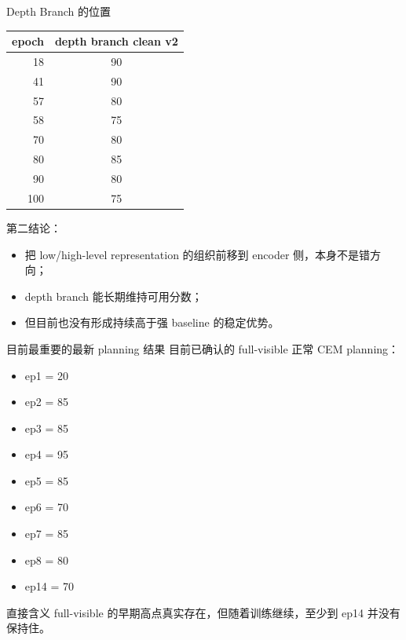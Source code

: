 \documentclass[aspectratio=169,11pt]{beamer}
\begin{document}
\begin{frame}{Depth Branch 的位置}
  \small
  \begin{tabular}{rc}
    \toprule
    epoch & depth branch clean v2 \\
    \midrule
    18 & 90 \\
    41 & 90 \\
    57 & 80 \\
    58 & 75 \\
    70 & 80 \\
    80 & 85 \\
    90 & 80 \\
    100 & 75 \\
    \bottomrule
  \end{tabular}

  \vspace{0.7em}
  第二结论：
  \begin{itemize}
    \item 把 low/high-level representation 的组织前移到 encoder 侧，本身不是错方向；
    \item depth branch 能长期维持可用分数；
    \item 但目前也没有形成持续高于强 baseline 的稳定优势。
  \end{itemize}
\end{frame}

\begin{frame}{目前最重要的最新 planning 结果}
  目前已确认的 full-visible 正常 CEM planning：
  \begin{itemize}
    \item ep1 = 20
    \item ep2 = 85
    \item ep3 = 85
    \item ep4 = 95
    \item ep5 = 85
    \item ep6 = 70
    \item ep7 = 85
    \item ep8 = 80
    \item ep14 = 70
  \end{itemize}

  \begin{block}{直接含义}
    full-visible 的早期高点真实存在，但随着训练继续，至少到 ep14 并没有保持住。
  \end{block}
\end{frame}
\end{document}

